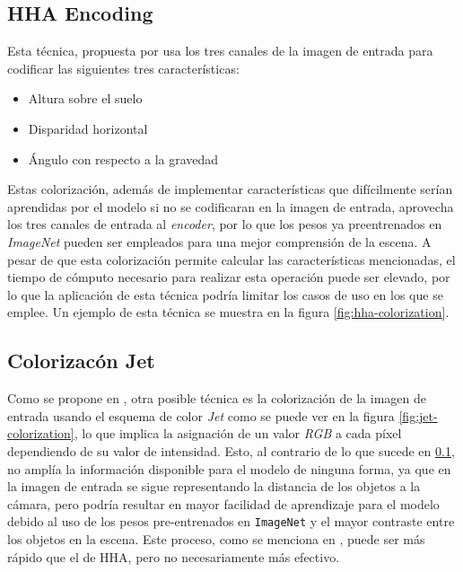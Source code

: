 \documentclass[12pt,a4paper]{report}
\begin{document}

\subsection{HHA Encoding}
\label{subsubsec:hha_encoding}
Esta técnica, propuesta por \cite{gupta2014learningrichfeaturesrgbd} usa los tres canales de la imagen de entrada para codificar las siguientes tres características:
\begin{itemize}
    \item Altura sobre el suelo
    \item Disparidad horizontal
    \item Ángulo con respecto a la gravedad
\end{itemize}
Estas colorización, además de implementar características que difícilmente serían aprendidas por el modelo si no se codificaran en la imagen de entrada, aprovecha los tres canales de entrada al \textit{encoder}, por lo que los pesos ya preentrenados en \textit{ImageNet} pueden ser empleados para una mejor comprensión de la escena. A pesar de que esta colorización permite calcular las características mencionadas, el tiempo de cómputo necesario para realizar esta operación puede ser elevado, por lo que la aplicación de esta técnica podría limitar los casos de uso en los que se emplee. Un ejemplo de esta técnica se muestra en la figura \ref{fig:hha-colorization}.

\subsection{Colorizacón Jet}
\label{subsubsec:jet_colorization}
Como se propone en \cite{eitel2015multimodaldeeplearningrobust}, otra posible técnica es la colorización de la imagen de entrada usando el esquema de color \textit{Jet} como se puede ver en la figura \ref{fig:jet-colorization}, lo que implica la asignación de un valor \textit{RGB} a cada píxel dependiendo de su valor de intensidad. Esto, al contrario de lo que sucede en \ref{subsubsec:hha_encoding}, no amplía la información disponible para el modelo de ninguna forma, ya que en la imagen de entrada se sigue representando la distancia de los objetos a la cámara, pero podría resultar en mayor facilidad de aprendizaje para el modelo debido al uso de los pesos pre-entrenados en \texttt{ImageNet} y el mayor contraste entre los objetos en la escena. Este proceso, como se menciona en \cite{eitel2015multimodaldeeplearningrobust}, puede ser más rápido que el de HHA, pero no necesariamente más efectivo.
\end{document}
